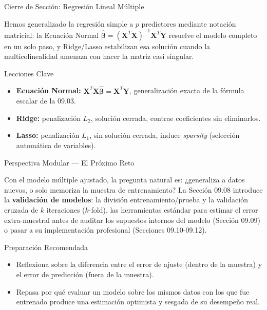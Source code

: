 \documentclass[10pt, aspectratio=169]{beamer}
\begin{document}
\begin{frame}{Cierre de Sección: Regresión Lineal Múltiple}
  \begin{reflexion}
    Hemos generalizado la regresión simple a $p$ predictores mediante notación matricial: la Ecuación Normal $\hat{\boldsymbol\beta}=(\mathbf{X}^T\mathbf{X})^{-1}\mathbf{X}^T\mathbf{Y}$ resuelve el modelo completo en un solo paso, y Ridge/Lasso estabilizan esa solución cuando la multicolinealidad amenaza con hacer la matriz casi singular.
  \end{reflexion}

  \vspace{0.2cm}
  \pause
  \begin{block}{Lecciones Clave}
    \begin{itemize}\itemsep=0.08cm
      \item \textbf{Ecuación Normal:} $\mathbf{X}^T\mathbf{X}\hat{\boldsymbol\beta}=\mathbf{X}^T\mathbf{Y}$, generalización exacta de la fórmula escalar de la 09.03.
      \item \textbf{Ridge:} penalización $L_2$, solución cerrada, contrae coeficientes sin eliminarlos.
      \item \textbf{Lasso:} penalización $L_1$, sin solución cerrada, induce \emph{sparsity} (selección automática de variables).
    \end{itemize}
  \end{block}
\end{frame}

\begin{frame}{Perspectiva Modular --- El Próximo Reto}
  \scriptsize
  \begin{retoclase}
    Con el modelo múltiple ajustado, la pregunta natural es: ¿generaliza a datos nuevos, o solo memoriza la muestra de entrenamiento? La Sección 09.08 introduce la \textbf{validación de modelos}: la división entrenamiento/prueba y la validación cruzada de $k$ iteraciones ($k$-fold), las herramientas estándar para estimar el error extra-muestral antes de auditar los supuestos internos del modelo (Sección 09.09) o pasar a su implementación profesional (Secciones 09.10-09.12).
  \end{retoclase}

  \vspace{0.08cm}
  \pause
  \begin{alertblock}{Preparación Recomendada}
    \begin{itemize}\itemsep=0.06cm
      \item Reflexiona sobre la diferencia entre el error de ajuste (dentro de la muestra) y el error de predicción (fuera de la muestra).
      \item Repasa por qué evaluar un modelo sobre los mismos datos con los que fue entrenado produce una estimación optimista y sesgada de su desempeño real.
    \end{itemize}
  \end{alertblock}
\end{frame}
\end{document}

